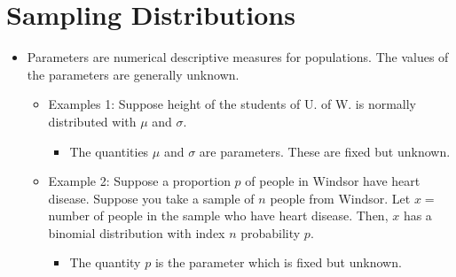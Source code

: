 \documentclass[12pt, letterpaper]{article}
\begin{document}
    \section{Sampling Distributions} 
        \begin{itemize}
            \item Parameters are numerical descriptive measures for populations. The values of the parameters are generally unknown.
            \begin{itemize}
                \item Examples 1: Suppose height of the students of U. of W. is normally distributed with $\mu$ and $\sigma$.
                \begin{itemize}
                    \item The quantities $\mu$ and $\sigma$ are parameters. These are fixed but unknown.
                \end{itemize}
                \item Example 2: Suppose a proportion $p$ of people in Windsor have heart disease. Suppose you take a sample of $n$ people from Windsor. Let $x = $ number of people in the sample who have heart disease. Then, $x$ has a binomial distribution with index $n$ probability $p$.
                \begin{itemize}
                    \item The quantity $p$ is the parameter which is fixed but unknown.
                \end{itemize}
            \end{itemize}
        \end{itemize}
\end{document}
